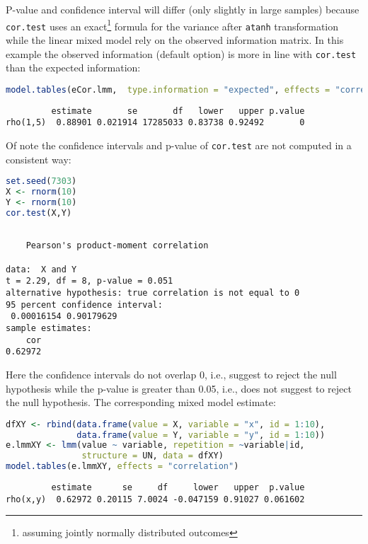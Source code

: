 \documentclass[12pt]{article}
\begin{document}
P-value and confidence interval will differ (only slightly in large
samples) because \texttt{cor.test} uses an exact\footnote{assuming jointly
normally distributed outcomes} formula for the variance after \texttt{atanh}
transformation while the linear mixed model rely on the observed
information matrix. In this example the observed information (default
option) is more in line with \texttt{cor.test} than the expected information:
\begin{lstlisting}[language=r,numbers=none]
model.tables(eCor.lmm,  type.information = "expected", effects = "correlation")["rho(1,5)",]
\end{lstlisting}

\label{}
\begin{verbatim}
         estimate       se       df   lower   upper p.value
rho(1,5)  0.88901 0.021914 17285033 0.83738 0.92492       0
\end{verbatim}


Of note the confidence intervals and p-value of \texttt{cor.test} are not
computed in a consistent way: 
\begin{lstlisting}[language=r,numbers=none]
set.seed(7303)
X <- rnorm(10)
Y <- rnorm(10)
cor.test(X,Y)
\end{lstlisting}

\label{}
\begin{verbatim}

	Pearson's product-moment correlation

data:  X and Y
t = 2.29, df = 8, p-value = 0.051
alternative hypothesis: true correlation is not equal to 0
95 percent confidence interval:
 0.00016154 0.90179629
sample estimates:
    cor 
0.62972
\end{verbatim}

\noindent Here the confidence intervals do not overlap 0, i.e.,
suggest to reject the null hypothesis while the p-value is greater
than 0.05, i.e., does not suggest to reject the null hypothesis. The
corresponding mixed model estimate:
\begin{lstlisting}[language=r,numbers=none]
dfXY <- rbind(data.frame(value = X, variable = "x", id = 1:10),
              data.frame(value = Y, variable = "y", id = 1:10))
e.lmmXY <- lmm(value ~ variable, repetition = ~variable|id,
               structure = UN, data = dfXY)
model.tables(e.lmmXY, effects = "correlation")
\end{lstlisting}

\label{}
\begin{verbatim}
         estimate      se     df     lower   upper  p.value
rho(x,y)  0.62972 0.20115 7.0024 -0.047159 0.91027 0.061602
\end{verbatim}
\end{document}
